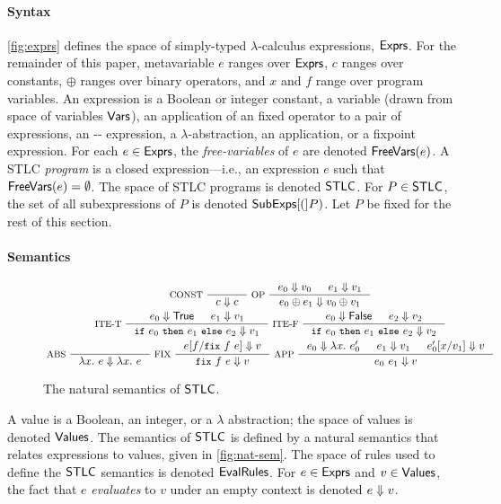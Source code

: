 \paragraph{Syntax} \autoref{fig:exprs} defines the space of
simply-typed $\lambda$-calculus expressions, $\mathsf{Exprs}$.
%
For the remainder of this paper, metavariable $e$ ranges over
$\mathsf{Exprs}$, %
$c$ ranges over constants, %
$\oplus$ ranges over binary operators, and $x$ and $f$ range over
program variables.
%
An expression is a Boolean or integer constant, %
a variable (drawn from space of variables $\mathsf{Vars}$), %
an application of an fixed operator to a pair of expressions, %
an -- expression, %
a $\lambda$-abstraction, %
an application, or %
a fixpoint expression.
%
For each $e \in \mathsf{Exprs}$, the \emph{free-variables} of $e$ are denoted
$\mathsf{FreeVars}(e)$.
%
A STLC \emph{program} is a closed expression---i.e., an expression $e$
such that $\mathsf{FreeVars}(e) = \emptyset$.
%
The space of STLC programs is denoted $\mathsf{STLC}$.
%
For $P \in \mathsf{STLC}$, the set of all subexpressions of $P$ is denoted
$\mathsf{SubExps}[ ( ]P)$.
%
Let $P$ be fixed for the rest of this section.

\paragraph{Semantics}
%
\begin{figure}
  \centering
  \begin{gather*}
  \inference[ CONST ]{ }{ c \evalsto c }
  \inference[ OP ]{ %
    e_0 \evalsto v_0 & %
    e_1 \evalsto v_1 } %
  { e_0 \oplus e_1 \evalsto v_0 \oplus v_1 } \\
  \inference[ ITE-T ]{ %
    e_0 \evalsto \true & %
    e_1 \evalsto v_1 } %
  { \ite{ e_0 }{ e_1 }{ e_2 } \evalsto v_1 }
  \inference[ ITE-F ]{ %
    e_0 \evalsto \false & %
    e_2 \evalsto v_2 } %
  { \ite{ e_0 }{ e_1 }{ e_2 } \evalsto v_2 } \\
  \inference[ ABS ]{ } %
  { \lambda x.\ e \evalsto \lambda x.\ e }
  \inference[ FIX ]{ \replace{e}{ \fix{ f }{ e } }{ f } \evalsto v } %
  { \fix{ f }{ e } \evalsto v }
  \inference[ APP ]{ %
    e_0 \evalsto \lambda x.\ e_0' & %
    e_1 \evalsto v_1 & %
    \replace{ e_0' }{ v_1 }{ x } \evalsto v }
  { e_0\ e_1 \evalsto v } 
  \end{gather*}
  \caption{The natural semantics of $\mathsf{STLC}$.}
  \label{fig:nat-sem}
\end{figure}
%
A value is a Boolean, an integer, or a $\lambda$ abstraction;
%
the space of values is denoted $\mathsf{Values}$.
%
The semantics of $\mathsf{STLC}$ is defined by a natural semantics that
relates expressions to values, given in \autoref{fig:nat-sem}.
%
The space of rules used to define the $\mathsf{STLC}$ semantics is denoted
$\mathsf{EvalRules}$.
%
For $e \in \mathsf{Exprs}$ and $v \in \mathsf{Values}$, the fact that $e$
\emph{evaluates} to $v$ under an empty context is denoted $e \Downarrow
v$.

